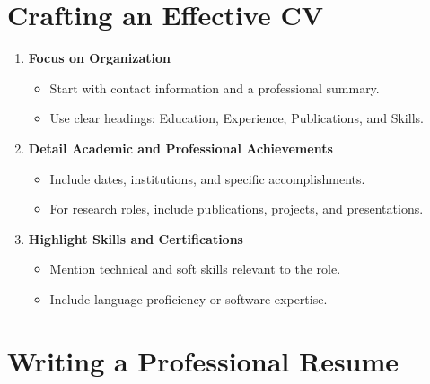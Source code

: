 \documentclass[
  letterpaper,
  DIV=11,
  numbers=noendperiod]{scrreprt}
\providecommand{\tightlist}{%
  \setlength{\itemsep}{0pt}\setlength{\parskip}{0pt}}\usepackage{longtable,booktabs,array}
\begin{document}
\section{Crafting an Effective CV}\label{crafting-an-effective-cv}

\begin{enumerate}
\def\labelenumi{\arabic{enumi}.}
\item
  \textbf{Focus on Organization}

  \begin{itemize}
  \tightlist
  \item
    Start with contact information and a professional summary.
  \item
    Use clear headings: Education, Experience, Publications, and Skills.
  \end{itemize}
\item
  \textbf{Detail Academic and Professional Achievements}

  \begin{itemize}
  \tightlist
  \item
    Include dates, institutions, and specific accomplishments.
  \item
    For research roles, include publications, projects, and
    presentations.
  \end{itemize}
\item
  \textbf{Highlight Skills and Certifications}

  \begin{itemize}
  \tightlist
  \item
    Mention technical and soft skills relevant to the role.
  \item
    Include language proficiency or software expertise.
  \end{itemize}
\end{enumerate}

\section{Writing a Professional
Resume}\label{writing-a-professional-resume}
\end{document}

